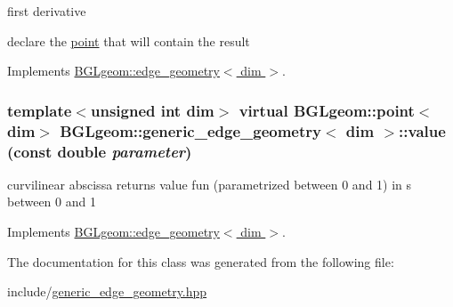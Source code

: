 first derivative 

declare the \hyperlink{classBGLgeom_1_1point}{point} that will contain the result 

Implements \hyperlink{classBGLgeom_1_1edge__geometry}{BGLgeom::edge\_\-geometry$<$ dim $>$}.\hypertarget{classBGLgeom_1_1generic__edge__geometry_a7bb600748e2b9aef8bf8bcb1bb5fec6e}{
\subsubsection[{value}]{\setlength{\rightskip}{0pt plus 5cm}template$<$unsigned int dim$>$ virtual {\bf BGLgeom::point}$<$dim$>$ {\bf BGLgeom::generic\_\-edge\_\-geometry}$<$ dim $>$::value (const double {\em parameter})}}
\label{classBGLgeom_1_1generic__edge__geometry_a7bb600748e2b9aef8bf8bcb1bb5fec6e}


curvilinear abscissa returns value fun (parametrized between 0 and 1) in s between 0 and 1 

Implements \hyperlink{classBGLgeom_1_1edge__geometry}{BGLgeom::edge\_\-geometry$<$ dim $>$}.

The documentation for this class was generated from the following file:\begin{DoxyCompactItemize}
\item 
include/\hyperlink{generic__edge__geometry_8hpp}{generic\_\-edge\_\-geometry.hpp}\end{DoxyCompactItemize}
